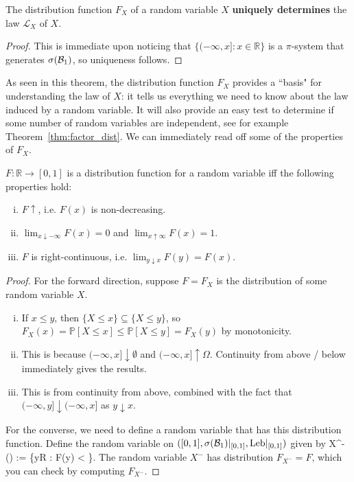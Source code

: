 \begin{theorem}
	The distribution function $F_X$ of a random variable $X$ \textbf{uniquely determines} the law $\mathcal L_X$ of $X$. 
\end{theorem}

\begin{proof}
	This is immediate upon noticing that $\{(-\infty, x] : x\in\mathbb R\}$ is a $\pi$-system that generates $\sigma(\mathcal{B}_{1})$, so uniqueness follows. 
\end{proof}

As seen in this theorem, the distribution function $F_X$ provides a ``basis" for understanding the law of $X$: it tells us everything we need to know about the law induced by a random variable. It will also provide an easy test to determine if some number of random variables are independent, see for example Theorem~\ref{thm:factor_dist}. We can immediately read off some of the properties of $F_X$.

\begin{theorem}
	$F : \mathbb R\rightarrow [0, 1]$ is a distribution function for a random variable iff the following properties hold:
	\begin{enumerate}[i)]
		\item $F\uparrow$, i.e. $F(x)$ is non-decreasing. 
		\item $\lim_{x\downarrow-\infty} F(x) = 0$ and $\lim_{x\uparrow\infty} F(x) = 1$. 
		\item $F$ is right-continuous, i.e. $\lim_{y\downarrow x} F(y) = F(x)$. 
	\end{enumerate}
\end{theorem}
\begin{proof}
	For the forward direction, suppose $F = F_X$ is the distribution of some random variable $X$. 
	\begin{enumerate}[i)]
		\item If $x\leq y$, then $\{X\leq x\}\subseteq\{X\leq y\}$, so $F_X(x) = \mathbb P[X\leq x] \leq \mathbb P[X\leq y] = F_X(y)$ by monotonicity. 
		\item This is because $(-\infty, x]\downarrow \emptyset$ and $(-\infty, x]\uparrow \Omega$. Continuity from above / below immediately gives the results. 
		\item This is from continuity from above, combined with the fact that $(-\infty, y]\downarrow (-\infty, x]$ as $y\downarrow x$. 
	\end{enumerate}
	For the converse, we need to define a random variable that has this distribution function. Define the random variable on $([0, 1], \sigma(\mathcal{B}_{1})|_{[0, 1]}, \mathrm{Leb}|_{[0, 1]})$ given by
	\eq
		X^-(\omega) := \sup\{y\in\mathbb R : F(y) < \omega\}.
	\qe
	The random variable $X^-$ has distribution $F_{X^-} = F$, which you can check by computing $F_{X^-}$. 
\end{proof}

